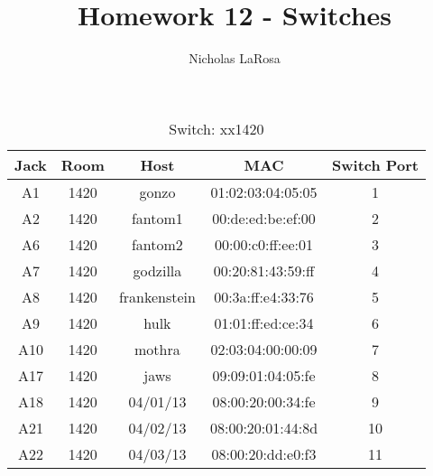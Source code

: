 \documentclass{article}
\title{Homework 12 - Switches}
\author{Nicholas LaRosa}
\begin{document}
\maketitle
\begin{table}[!htb]
	\centering
	\begin{tabular}{ | c | c | c | c | c | }
	\hline
	\textbf{Jack} & \textbf{Room} & \textbf{Host} & \textbf{MAC} & \textbf{Switch Port} \\ \hline
	A1 & 1420 & gonzo & 01:02:03:04:05:05 & 1 \\ \hline
	A2 & 1420 & fantom1 & 00:de:ed:be:ef:00 & 2 \\ \hline
	A6 & 1420 & fantom2 & 00:00:c0:ff:ee:01 & 3 \\ \hline
	A7 & 1420 & godzilla & 00:20:81:43:59:ff & 4 \\ \hline
	A8 & 1420 & frankenstein & 00:3a:ff:e4:33:76 & 5 \\ \hline
	A9 & 1420 & hulk & 01:01:ff:ed:ce:34 & 6 \\ \hline
	A10 & 1420 & mothra & 02:03:04:00:00:09 & 7 \\ \hline
	A17 & 1420 & jaws & 09:09:01:04:05:fe & 8 \\ \hline
	A18 & 1420 & 04/01/13 & 08:00:20:00:34:fe & 9 \\ \hline
	A21 & 1420 & 04/02/13 & 08:00:20:01:44:8d & 10 \\ \hline
	A22 & 1420 & 04/03/13 & 08:00:20:dd:e0:f3 & 11 \\ \hline
	\end{tabular}
	\caption{Switch: xx1420}
\end{table}
\end{document}
